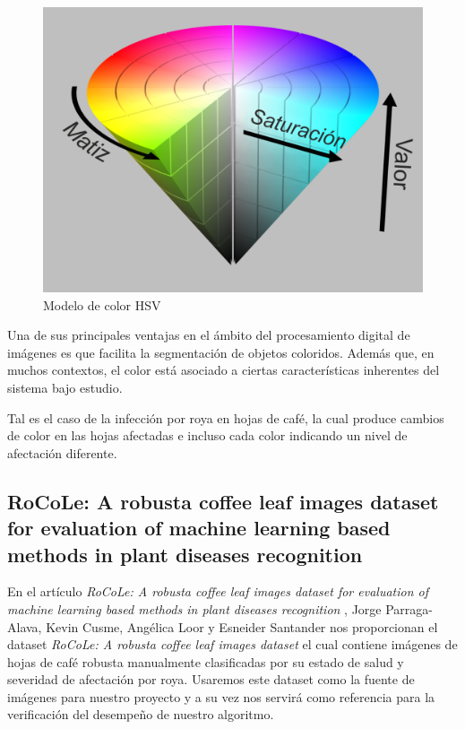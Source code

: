 \begin{figure}[H]
\centering
\includegraphics[scale=0.8]{images/hsv_model.png}
\caption{Modelo de color HSV}
\label{img:polygon}
\end{figure}

Una de sus principales ventajas en el ámbito del procesamiento digital de imágenes es que facilita la segmentación de objetos coloridos. Además que, en muchos contextos, el color está asociado a ciertas características inherentes del sistema bajo estudio.

Tal es el caso de la infección por roya en hojas de café, la cual produce cambios de color en las hojas afectadas e incluso cada color indicando un nivel de afectación diferente.

\subsection{RoCoLe: A robusta coffee leaf images dataset for evaluation of machine learning based methods in plant diseases recognition}
En el artículo \textit{RoCoLe: A robusta coffee leaf images dataset for evaluation of machine learning based methods in plant diseases recognition} \cite{PARRAGAALAVA2019104414}, Jorge Parraga-Alava, Kevin Cusme, Angélica Loor y Esneider Santander nos proporcionan el dataset \textit{RoCoLe: A robusta coffee leaf images dataset} \cite{RoCoLe} el cual contiene imágenes de hojas de café robusta manualmente clasificadas por su estado de salud y severidad de afectación por roya. Usaremos este dataset como la fuente de imágenes para nuestro proyecto y a su vez nos servirá como referencia para la verificación del desempeño de nuestro algoritmo.

